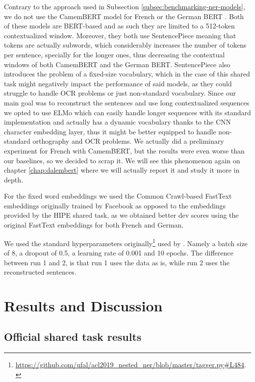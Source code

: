 Contrary to the approach used in Subsection \ref{subsec:benchmarking-ner-models}, we do not use the CamemBERT model \citep{martin-etal-2020-camembert} for French or the German BERT \citep{chan-etal-2019-german}. Both of these models are BERT-based and as such they are limited to a 512-token contextualized window. Moreover, they both use SentencePiece \citep{kudo-richardson-2018-sentencepiece} meaning that tokens are actually subwords, which considerably increases the number of tokens per sentence, specially for the longer ones, thus decreasing the contextual windows of both CamemBERT and the German BERT. SentencePiece also introduces the problem of a fixed-size vocabulary, which in the case of this shared task might negatively impact the performance of said models, as they could struggle to handle OCR problems or just non-standard vocabulary. Since our main goal was to reconstruct the sentences and use long contextualized sequences we opted to use ELMo which can easily handle longer sequences with its standard implementation and actually has a dynamic vocabulary thanks to the CNN character embedding layer, thus it might be better equipped to handle non-standard orthography and OCR problems. We actually did a preliminary experiment for French with CamemBERT, but the results were even worse than our baselines, so we decided to scrap it. We will see this phenomenon again on chapter \ref{chap:dalembert} where we will actually report it and study it more in depth.

For the fixed word embeddings we used the Common Crawl-based FastText embeddings \citep{grave-etal-2018-learning} originally trained by Facebook as opposed to the embeddings provided by the HIPE shared task, as we obtained better dev scores using the original FastText embeddings for both French and German.

We used the standard hyperparameters originally\footnote{\url{https://github.com/ufal/acl2019_nested_ner/blob/master/tagger.py\#L484}.} used by \citet{strakova-etal-2019-neural}. Namely a batch size of 8, a dropout of 0.5, a learning rate of 0.001 and 10 epochs. The difference between run 1 and 2, is that run 1 uses the data as is, while run 2 uses the reconstructed sentences.

\section{Results and Discussion}
\label{sec:results}

\subsection{Official shared task results}

